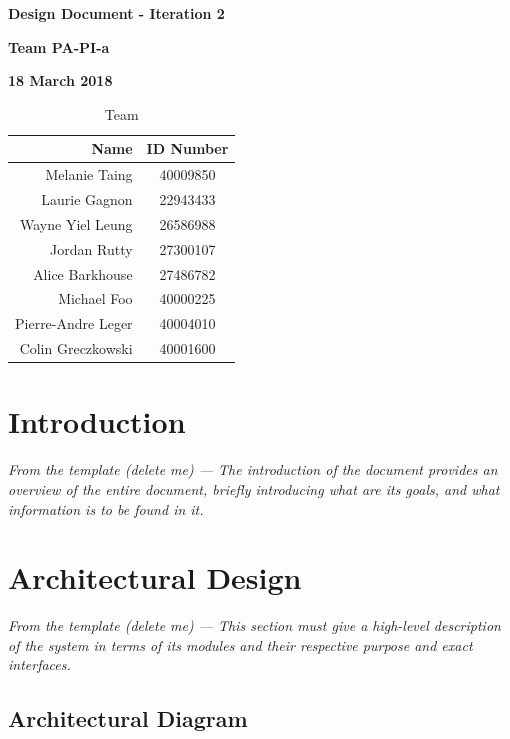 \documentclass[12pt]{article}
\begin{document}
\vspace*{0.5in}
\centerline{\bf\Large Design Document - Iteration 2}

\vspace*{0.5in}
\centerline{\bf\Large Team PA-PI-a}

\vspace*{0.5in}
\centerline{\bf\Large 18 March 2018}

\vspace*{1.5in}
\begin{table}[htbp]
\caption{Team}
\begin{center}
\begin{tabular}{|r | c|}
\hline
Name & ID Number \\
\hline\hline
Melanie Taing & 40009850 \\
Laurie Gagnon & 22943433 \\
Wayne Yiel Leung & 26586988 \\
Jordan Rutty & 27300107 \\
Alice Barkhouse & 27486782 \\
Michael Foo & 40000225 \\
Pierre-Andre Leger & 40004010 \\
Colin Greczkowski & 40001600 \\
\hline
\end{tabular}
\end{center}
\end{table}

\clearpage

\tableofcontents

\clearpage

\section{Introduction}
\textit {From the template (delete me) --- The introduction of the document provides an overview of the entire document, briefly introducing what are its goals, and what information is to be found in it.}

\section{Architectural Design} \label{sec:arch}

\textit {From the template (delete me) --- This section must give a high-level description of the system in terms of its modules and their respective purpose and exact interfaces.}

\subsection{Architectural Diagram}
\end{document}
